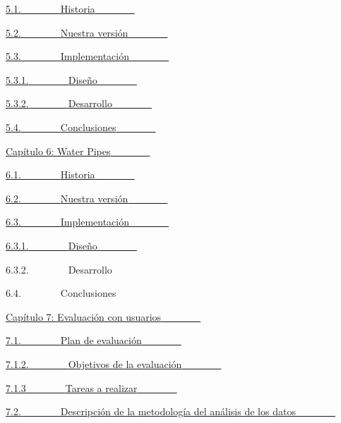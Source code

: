 \documentclass[]{article}
\begin{document}
\hyperref[h.147n2zr]{5.1.}\hyperref[h.147n2zr]{~~~~~~~~}\hyperref[h.147n2zr]{Historia}\hyperref[h.147n2zr]{~~~~~~~~}

\hyperref[h.3o7alnk]{5.2.}\hyperref[h.3o7alnk]{~~~~~~~~}\hyperref[h.3o7alnk]{Nuestra
versión}\hyperref[h.3o7alnk]{~~~~~~~~}

\hyperref[h.23ckvvd]{5.3.}\hyperref[h.23ckvvd]{~~~~~~~~}\hyperref[h.23ckvvd]{Implementación}\hyperref[h.23ckvvd]{~~~~~~~~}

\hyperref[h.ihv636]{5.3.1.}\hyperref[h.ihv636]{~~~~~~~~}\hyperref[h.ihv636]{Diseño}\hyperref[h.ihv636]{~~~~~~~~}

\hyperref[h.32hioqz]{5.3.2.}\hyperref[h.32hioqz]{~~~~~~~~}\hyperref[h.32hioqz]{Desarrollo}\hyperref[h.32hioqz]{~~~~~~~~}

\hyperref[h.41mghml]{5.4.}\hyperref[h.41mghml]{~~~~~~~~}\hyperref[h.41mghml]{Conclusiones}\hyperref[h.41mghml]{~~~~~~~~}

\hyperref[h.2grqrue]{Capítulo 6: Water
Pipes}\hyperref[h.2grqrue]{~~~~~~~~}

\hyperref[h.vx1227]{6.1.}\hyperref[h.vx1227]{~~~~~~~~}\hyperref[h.vx1227]{Historia}\hyperref[h.vx1227]{~~~~~~~~}

\hyperref[h.3fwokq0]{6.2.}\hyperref[h.3fwokq0]{~~~~~~~~}\hyperref[h.3fwokq0]{Nuestra
versión}\hyperref[h.3fwokq0]{~~~~~~~~}

\hyperref[h.1v1yuxt]{6.3.}\hyperref[h.1v1yuxt]{~~~~~~~~}\hyperref[h.1v1yuxt]{Implementación}\hyperref[h.1v1yuxt]{~~~~~~~~}

\hyperref[h.4f1mdlm]{6.3.1.}\hyperref[h.4f1mdlm]{~~~~~~~~}\hyperref[h.4f1mdlm]{Diseño}\hyperref[h.4f1mdlm]{~~~~~~~~}

6.3.2.~~~~~~~~Desarrollo~~~~~~~~

6.4.~~~~~~~~Conclusiones~~~~~~~~

\hyperref[h.3tbugp1]{Capítulo 7: Evaluación con
usuarios}\hyperref[h.3tbugp1]{~~~~~~~~}

\hyperref[h.3tbugp1]{7.1.}\hyperref[h.3tbugp1]{~~~~~~~~}\hyperref[h.3tbugp1]{Plan
de evaluación}\hyperref[h.3tbugp1]{~~~~~~~~}

\hyperref[h.28h4qwu]{7.1.2.}\hyperref[h.28h4qwu]{~~~~~~~~}\hyperref[h.28h4qwu]{Objetivos
de la evaluación}\hyperref[h.28h4qwu]{~~~~~~~~}

\hyperref[h.nmf14n]{7.1.3}\hyperref[h.nmf14n]{~~~~~~~~}\hyperref[h.nmf14n]{Tareas
a realizar}\hyperref[h.nmf14n]{~~~~~~~~}

\hyperref[h.37m2jsg]{7.2.}\hyperref[h.37m2jsg]{~~~~~~~~}\hyperref[h.37m2jsg]{Descripción
de la metodología del análisis de los
datos}\hyperref[h.37m2jsg]{~~~~~~~~}
\end{document}

